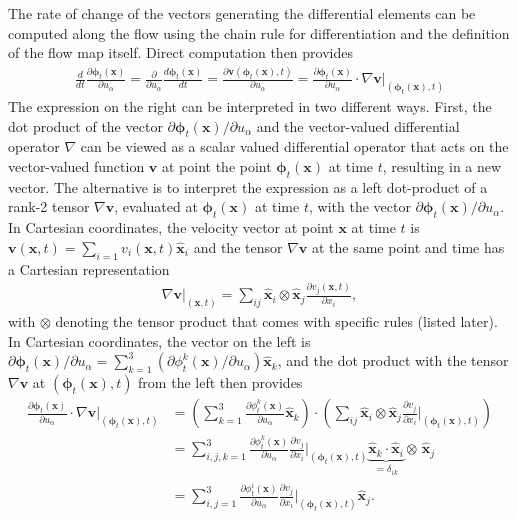 The rate of change of the vectors generating the differential elements can be computed along the flow using the chain rule for differentiation and the definition of the flow map itself. Direct computation then provides 
\begin{align}
    \frac{d}{dt}\frac{\partial\bm{\phi}_t(\bm{x})}{\partial u_\alpha}=\frac{\partial}{\partial u_\alpha}\frac{d\bm{\phi}_t(\bm{x})}{dt}=\frac{\partial \bm{v}(\bm{\phi}_t(\bm{x}),t)}{\partial u_\alpha}=\frac{\partial\bm{\phi}_t(\bm{x})}{\partial u_\alpha}\cdot\nabla\bm{v}\Big|_{(\bm{\phi}_t(\bm{x}),t)}
\end{align}
The expression on the right can be interpreted in two different ways. First, the dot product of the vector $\partial\bm{\phi}_t(\bm{x})/\partial u_\alpha$ and the vector-valued differential operator $\nabla$ can be viewed as a scalar valued differential operator that acts on the vector-valued function $\bm{v}$ at point the point $\bm{\phi}_t(\bm{x})$ at time $t$, resulting in a new vector. The alternative is to interpret the expression as a left dot-product of a rank-2 tensor $\nabla\bm{v}$, evaluated at $\bm{\phi}_t(\bm{x})$ at time $t$, with the vector $\partial \bm{\phi}_t(\bm{x})/\partial u_\alpha$.
In Cartesian coordinates, the velocity vector at point $\bm{x}$ at time $t$ is $\bm{v}(\bm{x},t)=\sum_{i=1}v_i(\bm{x},t)\bm{\hat{x}}_i$ and the tensor $\nabla\bm{v}$ at the same point and time has a Cartesian representation
\begin{align}
    \nabla\bm{v}\Big|_{(\bm{x},t)}=\sum_{ij}\bm{\hat{x}}_i\otimes\bm{\hat{x}}_j\frac{\partial v_j(\bm{x},t)}{\partial x_i},
\end{align}
with $\otimes$ denoting the tensor product that comes with specific rules (listed later). In Cartesian coordinates, the vector on the left is $\partial\bm{\phi}_t(\bm{x})/\partial u_\alpha=\sum_{k=1}^3(\partial\phi^k_t(\bm{x})/\partial u_\alpha)\bm{\hat{x}}_k$, and the dot product with the tensor $\nabla\bm{v}$ at $(\bm{\phi}_t(\bm{x}),t)$ from the left then provides
\begin{align}
    \frac{\partial\bm{\phi}_t(\bm{x})}{\partial u_\alpha}\cdot\nabla\bm{v}\Big|_{(\bm{\phi}_t(\bm{x}),t)}&=\left(\sum_{k=1}^3\frac{\partial \phi^k_t(\bm{x})}{\partial u_\alpha}\bm{\hat{x}}_k\right)\cdot\left(\sum_{ij}\bm{\hat{x}}_i\otimes\bm{\hat{x}}_j\frac{\partial v_j}{\partial x_i}\Big|_{(\bm{\phi}_t(\bm{x}),t)}\right)\nonumber\\
    &=\sum_{i,j,k=1}^3\frac{\partial\phi^k_t(\bm{x})}{\partial u_\alpha}\frac{\partial v_j}{\partial x_i}\Big|_{(\bm{\phi}_t(\bm{x}),t)} \underbrace{\bm{\hat{x}}_k\cdot\bm{\hat{x}}_i}_{=\delta_{ik}}\otimes\,\bm{\hat{x}}_j\nonumber\\
    &=\sum_{i,j=1}^{3}\frac{\partial \phi^i_t(\bm{x})}{\partial u_\alpha}\frac{\partial v_j}{\partial x_i}\Big|_{(\bm{\phi}_t(\bm{x}),t)}\bm{\hat{x}}_j.
\end{align}
